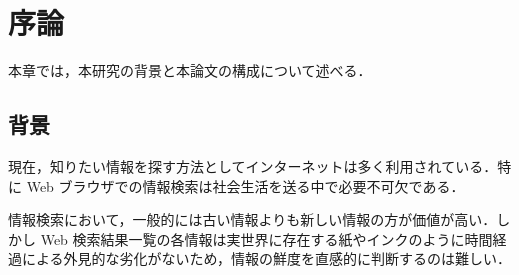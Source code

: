 \chapter{序論}
\label{chap:introduction}

本章では，本研究の背景と本論文の構成について述べる．

\newpage

\section{背景}

現在，知りたい情報を探す方法としてインターネットは多く利用されている．特に Web ブラウザでの情報検索は社会生活を送る中で必要不可欠である．

情報検索において，一般的には古い情報よりも新しい情報の方が価値が高い．しかし Web 検索結果一覧の各情報は実世界に存在する紙やインクのように時間経過による外見的な劣化がないため，情報の鮮度を直感的に判断するのは難しい．

